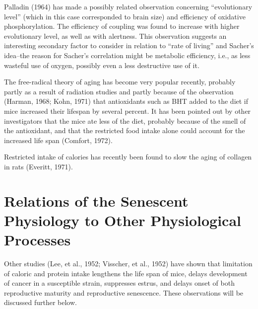 Palladin (1964) has made a possibly related observation concerning ``evolutionary level'' (which in this case corresponded to brain size) and efficiency of oxidative phosphorylation. The efficiency of coupling was found
to increase with higher evolutionary level, as well as with alertness. This observation suggests an interesting secondary factor to consider in relation to ``rate of living'' and Sacher's idea--the reason for Sacher's
correlation might be metabolic efficiency, i.e., as less wasteful use of oxygen, possibly even a less destructive use of it.

The free-radical theory of aging has become very popular recently, probably partly as a result of radiation studies and partly because of the observation (Harman, 1968; Kohn, 1971) that antioxidants such as BHT added to
the diet if mice increased their lifespan by several percent. It has been pointed out by other investigators that the mice ate less of the diet, probably because of the smell of the antioxidant, and that the restricted
food intake alone could account for the increased life span (Comfort, 1972).

Restricted intake of calories has recently been found to slow the aging of collagen in rats (Everitt, 1971).

\section{Relations of the Senescent Physiology to Other Physiological Processes}


Other studies (Lee, et al., 1952; Visscher, et al., 1952) have shown that limitation of caloric and protein intake lengthens the life span of mice, delays development of cancer in a susceptible strain, suppresses estrus, and delays
onset of both reproductive maturity and reproductive senescence. These observations will be discussed further below.

